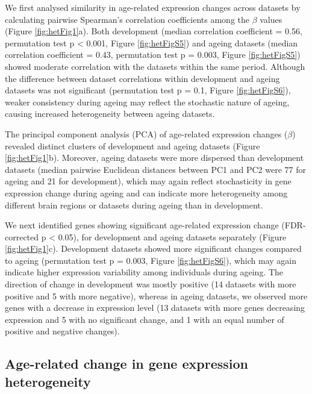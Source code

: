 \documentclass[12pt,twoside]{unicam}
\begin{document}
We first analysed similarity in age-related expression changes across datasets by calculating pairwise Spearman's correlation coefficients among the \(\beta\) values (Figure \ref{fig:hetFig1}a). Both development (median correlation coefficient = 0.56, permutation test p \textless{} 0.001, Figure \ref{fig:hetFigS5}) and ageing datasets (median correlation coefficient = 0.43, permutation test p = 0.003, Figure \ref{fig:hetFigS5}) showed moderate correlation with the datasets within the same period. Although the difference between dataset correlations within development and ageing datasets was not significant (permutation test p = 0.1, Figure \ref{fig:hetFigS6}), weaker consistency during ageing may reflect the stochastic nature of ageing, causing increased heterogeneity between ageing datasets.

The principal component analysis (PCA) of age-related expression changes (\(\beta\)) revealed distinct clusters of development and ageing datasets (Figure \ref{fig:hetFig1}b). Moreover, ageing datasets were more dispersed than development datasets (median pairwise Euclidean distances between PC1 and PC2 were 77 for ageing and 21 for development), which may again reflect stochasticity in gene expression change during ageing and can indicate more heterogeneity among different brain regions or datasets during ageing than in development.

We next identified genes showing significant age-related expression change (FDR-corrected p \textless{} 0.05), for development and ageing datasets separately (Figure \ref{fig:hetFig1}c). Development datasets showed more significant changes compared to ageing (permutation test p = 0.003, Figure \ref{fig:hetFigS6}), which may again indicate higher expression variability among individuals during ageing. The direction of change in development was mostly positive (14 datasets with more positive and 5 with more negative), whereas in ageing datasets, we observed more genes with a decrease in expression level (13 datasets with more genes decreasing expression and 5 with no significant change, and 1 with an equal number of positive and negative changes).

\hypertarget{age-related-change-in-gene-expression-heterogeneity}{%
\subsection{Age-related change in gene expression heterogeneity}\label{age-related-change-in-gene-expression-heterogeneity}}
\end{document}
